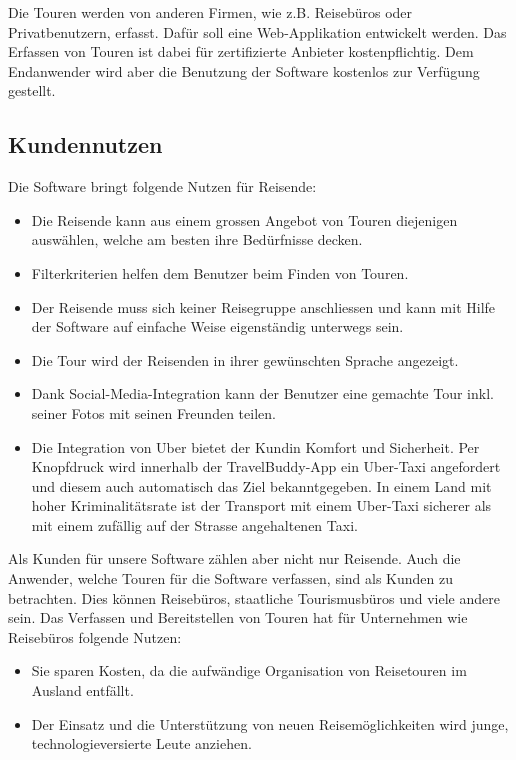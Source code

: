 Die Touren werden von anderen Firmen, wie z.B. Reisebüros oder Privatbenutzern, erfasst. Dafür soll eine Web-Applikation entwickelt werden. Das Erfassen von Touren ist dabei für zertifizierte Anbieter kostenpflichtig. Dem Endanwender wird aber die Benutzung der Software kostenlos zur Verfügung gestellt.

\subsection{Kundennutzen}\label{Kundennutzen}
Die Software bringt folgende Nutzen für Reisende:

\begin{itemize}
\item Die Reisende kann aus einem grossen Angebot von Touren diejenigen auswählen, welche am besten ihre Bedürfnisse decken.
\item Filterkriterien helfen dem Benutzer beim Finden von Touren.
\item Der Reisende muss sich keiner Reisegruppe anschliessen und kann mit Hilfe der Software auf einfache Weise eigenständig unterwegs sein.
\item Die Tour wird der Reisenden in ihrer gewünschten Sprache angezeigt.
\item Dank Social-Media-Integration kann der Benutzer eine gemachte Tour inkl. seiner Fotos mit seinen Freunden teilen.
\item Die Integration von Uber bietet der Kundin Komfort und Sicherheit. Per Knopfdruck wird innerhalb der TravelBuddy-App ein Uber-Taxi angefordert und diesem auch automatisch das Ziel bekanntgegeben. In einem Land mit hoher Kriminalitätsrate ist der Transport mit einem Uber-Taxi sicherer als mit einem zufällig auf der Strasse angehaltenen Taxi.
\end{itemize}

Als Kunden für unsere Software zählen aber nicht nur Reisende. Auch die Anwender, welche Touren für die Software verfassen, sind als Kunden zu betrachten. Dies können Reisebüros, staatliche Tourismusbüros und viele andere sein. Das Verfassen und Bereitstellen von Touren hat für Unternehmen wie Reisebüros folgende Nutzen:

\begin{itemize}
\item Sie sparen Kosten, da die aufwändige Organisation von Reisetouren im Ausland entfällt.
\item Der Einsatz und die Unterstützung von neuen Reisemöglichkeiten wird junge, technologieversierte Leute anziehen.
\end{itemize}

